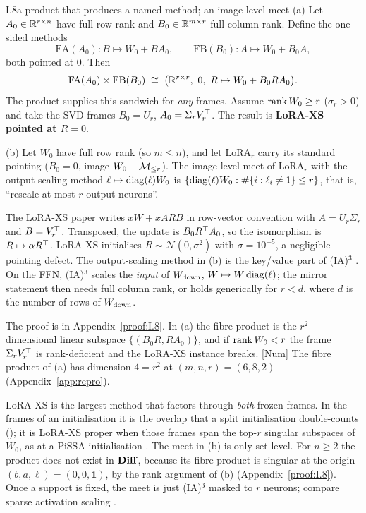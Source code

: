 \begin{proposition}{I.8}{a product that produces a named method; an image-level meet}
(a) Let $A_0\in\mathbb{R}^{r\times n}$ have full row rank and $B_0\in\mathbb{R}^{m\times r}$ full column rank. Define the one-sided methods
\begin{equation*}
  \mathrm{FA}(A_0):B\mapsto W_0+BA_0,\qquad \mathrm{FB}(B_0):A\mapsto W_0+B_0A,
\end{equation*}
both pointed at $0$. Then
\begin{equation*}
  \mathrm{FA}(A_0)\times\mathrm{FB}(B_0)\;\cong\;\big(\mathbb{R}^{r\times r},\ 0,\ R\mapsto W_0+B_0RA_0\big).
\end{equation*}
The product supplies this sandwich for \emph{any} frames. Assume $\operatorname{rank} W_0\ge r$ ($\sigma_r>0$) and take the SVD frames
$B_0=U_r$, $A_0=\Sigma_rV_r^{\top}$. The result is \textbf{LoRA-XS pointed at $R=0$}.

(b) Let $W_0$ have full row rank (so $m\le n$), and let $\mathrm{LoRA}_r$ carry its standard pointing ($B_0=0$, image
$W_0+\mathcal{M}_{\le r}$). The image-level meet of $\mathrm{LoRA}_r$ with the output-scaling method $\ell\mapsto\operatorname{diag}(\ell)W_0$ is
$\{\operatorname{diag}(\ell)W_0:\#\{i:\ell_i\neq1\}\le r\}$, that is, ``rescale at most $r$ output neurons''.

\upshape The LoRA-XS paper \citep{baazy2024lora} writes $xW+xARB$ in row-vector convention with $A=U_r\Sigma_r$ and
$B=V_r^{\top}$. Transposed, the update is $B_0R^{\top} A_0$, so the isomorphism is $R\mapsto\alpha R^{\top}$. LoRA-XS initialises
$R\sim\mathcal N(0,\sigma^2)$ with $\sigma=10^{-5}$, a negligible pointing defect. The output-scaling method in (b) is the
key/value part of (IA)$^3$ \citep{liu2022few}. On the FFN, (IA)$^3$ scales the \emph{input} of $W_{\rm down}$,
$W\mapsto W\operatorname{diag}(\ell)$; the mirror statement then needs full column rank, or holds generically for $r<d$, where $d$ is the
number of rows of $W_{\rm down}$.
\end{proposition}

\noindent The proof is in Appendix~\ref{proof:I.8}. In (a) the fibre product is the $r^2$-dimensional linear subspace
$\{(B_0R,RA_0)\}$, and if $\operatorname{rank} W_0<r$ the frame $\Sigma_rV_r^{\top}$ is rank-deficient and the LoRA-XS instance breaks.
[Num] The fibre product of (a) has dimension $4=r^2$ at $(m,n,r)=(6,8,2)$ (Appendix~\ref{app:repro}).

\begin{explains}
LoRA-XS is the largest method that factors through \emph{both} frozen frames. In the frames of an initialisation it is the
overlap that a split initialisation double-counts (); it is LoRA-XS proper when those frames span
the top-$r$ singular subspaces of $W_0$, as at a PiSSA initialisation \citep{meng2024pissa}. The meet in (b) is only
set-level. For $n\ge2$ the product does not exist in $\mathbf{Diff}$, because its fibre product is singular at the origin
$(b,a,\ell)=(0,0,\mathbf 1)$, by the rank argument of (b) (Appendix~\ref{proof:I.8}). Once a support is fixed, the meet is
just (IA)$^3$ masked to $r$ neurons; compare sparse activation scaling \citep{xstoehr2024activation}.
\end{explains}

